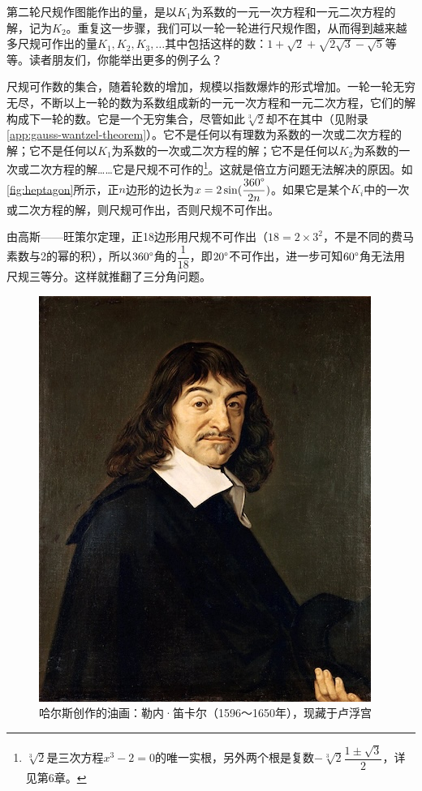\documentclass[b5paper]{ctexart}
\begin{document}
第二轮尺规作图能作出的量，是以$K_1$为系数的一元一次方程和一元二次方程的解，记为$K_2$。重复这一步骤，我们可以一轮一轮进行尺规作图，从而得到越来越多尺规可作出的量$K_1, K_2, K_3, \dotsc$其中包括这样的数：$1 + \sqrt{2} + \sqrt{2\sqrt{3} - \sqrt{5}}$等等。读者朋友们，你能举出更多的例子么？

尺规可作数的集合，随着轮数的增加，规模以指数爆炸的形式增加。一轮一轮无穷无尽，不断以上一轮的数为系数组成新的一元一次方程和一元二次方程，它们的解构成下一轮的数。它是一个无穷集合，尽管如此$\sqrt[3]{2}$却不在其中（见附录\ref{app:gauss-wantzel-theorem}）。它不是任何以有理数为系数的一次或二次方程的解；它不是任何以$K_1$为系数的一次或二次方程的解；它不是任何以$K_2$为系数的一次或二次方程的解……它是尺规不可作的\footnote{$\sqrt[3]{2}$是三次方程$x^3 - 2 = 0$的唯一实根，另外两个根是复数$-\sqrt[3]{2}\dfrac{1 \pm \sqrt{3}}{2}$，详见第6章。}。这就是倍立方问题无法解决的原因。如\cref{fig:heptagon}所示，正$n$边形的边长为$x = 2\sin(\dfrac{360\degree}{2n})$。如果它是某个$K_i$中的一次或二次方程的解，则尺规可作出，否则尺规不可作出。

由高斯——旺策尔定理，正18边形用尺规不可作出（$18 = 2 \times 3^2$，不是不同的费马素数与2的幂的积），所以$360\degree$角的$\dfrac{1}{18}$，即$20\degree$不可作出，进一步可知$60\degree$角无法用尺规三等分。这样就推翻了三分角问题。

\begin{figure}[htbp]
 \centering
 \includegraphics[scale=0.4]{img/Descartes}
 \caption{哈尔斯创作的油画：勒内·笛卡尔（1596～1650年），现藏于卢浮宫}
 \label{fig:Decartes}
\end{figure}
\end{document}
